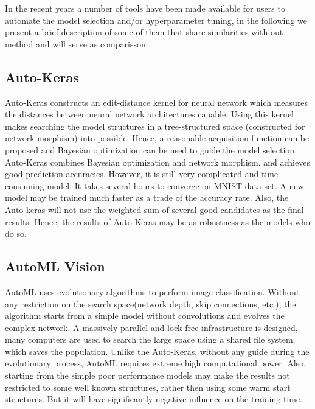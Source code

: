 \documentclass[journal]{IEEEtran}
\begin{document}

In the recent years a number of tools have been made available for users to automate the model selection and/or hyperparameter tuning, in the following we present a brief description of some of them that share similarities with out method and will serve as comparisson.

\subsection{Auto-Keras}

Auto-Keras \cite{AutoKeras2018} constructs an edit-distance kernel for neural network which measures the distances between neural network architectures capable. Using this kernel makes searching the model structures in a tree-structured space (constructed for network morphism) into possible. Hence, a reasonable acquisition function can be proposed and Bayesian optimization can be used to guide the model selection. Auto-Keras combines Bayesian optimization and network morphism, and achieves good prediction accuracies. However, it is still very complicated and time consuming model. It takes several hours to converge on MNIST data set. A new model may be trained much faster as a trade of the accuracy rate. Also, the Auto-keras will not use the weighted sum of several good candidates as the final results. Hence, the results of Auto-Keras may be as robustness as the models who do so.

\subsection{AutoML Vision}

AutoML \cite{AutoML2017} uses evolutionary algorithms to perform image classification. Without any restriction on the search space(network depth, skip connections, etc.), the algorithm starts from a simple model without convolutions and evolves the complex network. A massively-parallel and lock-free infrastructure is designed, many computers are used to search the large space using a shared file system, which saves the population. Unlike the Auto-Keras, without any guide during the evolutionary process, AutoML requires extreme high computational power. Also, starting from the simple poor performance models may make the results not restricted to some well known structures, rather then using some warm start structures. But it will have significantly negative influence on the training time.
\end{document}

